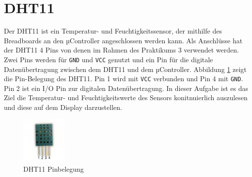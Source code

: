 \section{\ExercisePrefixEmbeddedC DHT11 \optional}
Der DHT11 ist ein Temperatur- und Feuchtigkeitssensor, der mithilfe des Breadboards an den µController angeschlossen werden kann.
Als Anschlüsse hat der DHT11 4 Pins von denen im Rahmen des Praktikums  3 verwendet werden.
Zwei Pins werden für \lstinline|GND| und \lstinline|VCC| genutzt und ein Pin für die digitale Datenübertragung zwischen dem DHT11 und dem µController.
Abbildung \ref{fig:dht11Pins} zeigt die Pin-Belegung des DHT11.
Pin 1 wird mit \lstinline|VCC| verbunden und Pin 4 mit \lstinline|GND|. Pin 2 ist ein I/O Pin zur digitalen Datenübertragung.
In dieser Aufgabe ist es das Ziel die Temperatur- und Feuchtigkeitswerte des Sensors konitnuierlich auszulesen und diese auf dem Display darzustellen.
\begin{figure}[!htb]
	\centering
	\includegraphics[width=0.2\textwidth]{./05_c/figures/DHT11.png}
	\caption{DHT11 Pinbelegung}
	\label{fig:dht11Pins}
\end{figure} 

